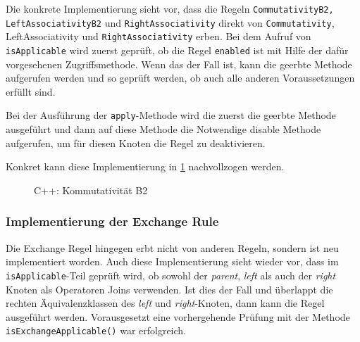 Die konkrete Implementierung sieht vor, dass die Regeln \texttt{Commutativity\-B2, Left\-Associativity\-B2} und \texttt{Right\-Associativity} direkt von \texttt{Commutativity}, \texttt{}{Left\-Associativity} und \texttt{Right\-Associativity} erben. Bei dem Aufruf von \texttt{is\-Applicable} wird zuerst geprüft, ob die Regel \texttt{enabled} ist mit Hilfe der dafür vorgesehenen Zugriffsmethode. Wenn das der Fall ist, kann die geerbte Methode aufgerufen werden und so geprüft werden, ob auch alle anderen Voraussetzungen erfüllt sind.

Bei der Ausführung der \texttt{apply}-Methode wird die zuerst die geerbte Methode ausgeführt und dann auf diese Methode die Notwendige disable Methode aufgerufen, um für diesen Knoten die Regel zu deaktivieren.

Konkret kann diese Implementierung in \ref{CommutativityB2Code} nachvollzogen werden.


\begin{figure}[ht]

\caption{C++: Kommutativität B2}
\label{CommutativityB2Code}
\end{figure}



\subsubsection{Implementierung der Exchange Rule}
Die Exchange Regel hingegen erbt nicht von anderen Regeln, sondern ist neu implementiert worden. Auch diese Implementierung sieht wieder vor, dass im \texttt{is\-Applicable}-Teil geprüft wird, ob sowohl der \textit{parent}, \textit{left} als auch der \textit{right} Knoten als Operatoren Joins verwenden. Ist dies der Fall und überlappt die rechten Äquivalenzklassen des \textit{left} und \textit{right}-Knoten, dann kann die Regel ausgeführt werden. Vorausgesetzt eine vorhergehende Prüfung mit der Methode \texttt{is\-Exchange\-Applicable()} war erfolgreich. 